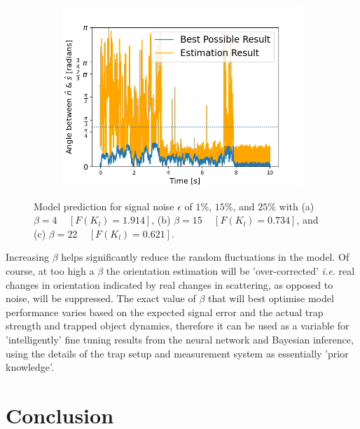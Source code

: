 \documentclass[final,  3p]{elsarticle}
\begin{document}
\begin{figure}[h]
\begin{subfigure}{0.32\textwidth}
		\includegraphics[width=\textwidth]{./Images/fig7c.png}
	\end{subfigure}
	\caption{Model prediction for signal noise $\epsilon$ of $1\%$, $15\%$, and $25\%$ with (a) $\beta=4$ ~ $[F(K_l)=1.914]$, (b) $\beta=15$ ~  $[F(K_l)=0.734]$, and (c) $\beta=22$ ~ $[F(K_l)=0.621]$.} 
	\label{fig:beta}
\end{figure}

Increasing $\beta$ helps significantly reduce the random fluctuations in the model. Of course, at too high a $\beta$ the orientation estimation will be 'over-corrected' \textit{i.e.} real changes in orientation indicated by real changes in scattering, as opposed to noise, will be suppressed. The exact value of $\beta$ that will best optimise model performance varies based on the expected signal error and the actual trap strength and trapped object dynamics, therefore  it can be used as a variable for 'intelligently' fine tuning results from the neural network and Bayesian inference, using the details of the trap setup and measurement system as essentially 'prior knowledge'. 


\section{Conclusion}
\label{sec:Conclusion}
\end{document}
